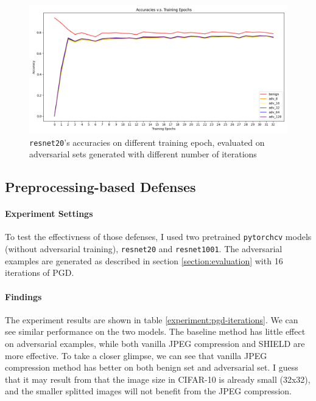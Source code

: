 \documentclass{article}
\begin{document}
\begin{figure}[ht]
  \begin{center}
  \includegraphics[width=0.8\linewidth]{imgs/exp-training-epochs.png}
  \end{center}
  \caption{\texttt{resnet20}'s accuracies on different training epoch, evaluated on adversarial sets
  generated with different number of iterations}
  \label{img:exp-training-epochs}
\end{figure}

\subsection{Preprocessing-based Defenses}
\paragraph{Experiment Settings} To test the effectivness of those defenses, I used two pretrained
\texttt{pytorchcv} models (without adversarial training), \texttt{resnet20} and \texttt{resnet1001}.
The adversarial examples are generated as described in section \ref{section:evaluation}
with 16 iterations of PGD.

\paragraph{Findings} The experiment results are shown in table
\ref{experiment:pgd-iterations}. We can see similar performance on the two models. The
baseline method has little effect on adversarial examples, while both vanilla JPEG compression and
SHIELD are more effective. To take a closer glimpse, we can see that vanilla JPEG compression method
has better on both benign set and adversarial set. I guess that it may result from that the image
size in CIFAR-10 is already small (32x32), and the smaller splitted images will not benefit from the
JPEG compression.
\end{document}
